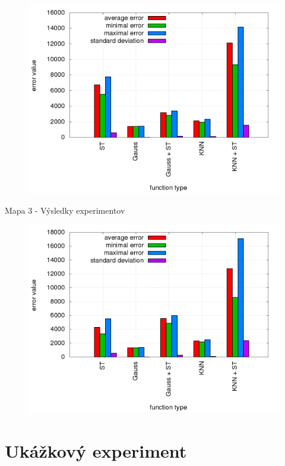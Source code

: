 \begin{figure}[!htb]
\centering
\includegraphics[scale=.4]{../../results_q_learning/map_2/trials_average_results.png}
\end{figure}


Mapa 3 - Výsledky experimentov

\begin{figure}[!htb]
\centering
\includegraphics[scale=.4]{../../results_q_learning/map_3/trials_average_results.png}
\end{figure}


\section {Ukážkový experiment}


